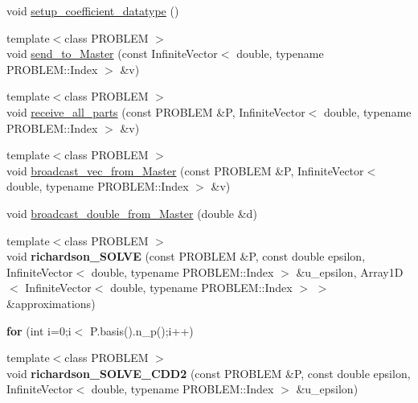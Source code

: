 \begin{CompactItemize}
\item 
void \hyperlink{namespaceFrameTL_010a7b97f26561b6923f285c1cbb8d02}{setup\_\-coefficient\_\-datatype} ()
\item 
{\footnotesize template$<$class PROBLEM $>$ }\\void \hyperlink{namespaceFrameTL_868f995657a7f68345fe24340658282e}{send\_\-to\_\-Master} (const InfiniteVector$<$ double, typename PROBLEM::Index $>$ \&v)
\item 
{\footnotesize template$<$class PROBLEM $>$ }\\void \hyperlink{namespaceFrameTL_3ea47092508598512ecc54955117a16f}{receive\_\-all\_\-parts} (const PROBLEM \&P, InfiniteVector$<$ double, typename PROBLEM::Index $>$ \&v)
\item 
{\footnotesize template$<$class PROBLEM $>$ }\\void \hyperlink{namespaceFrameTL_99afa22a98a5b20d8326b2983bb19088}{broadcast\_\-vec\_\-from\_\-Master} (const PROBLEM \&P, InfiniteVector$<$ double, typename PROBLEM::Index $>$ \&v)
\item 
void \hyperlink{namespaceFrameTL_5b01ba18f76ca06fb77d8cbca90492e8}{broadcast\_\-double\_\-from\_\-Master} (double \&d)
\item 
\hypertarget{namespaceFrameTL_bacf8c8fd02179e596a29355d939ec7c}{
{\footnotesize template$<$class PROBLEM $>$ }\\void \textbf{richardson\_\-SOLVE} (const PROBLEM \&P, const double epsilon, InfiniteVector$<$ double, typename PROBLEM::Index $>$ \&u\_\-epsilon, Array1D$<$ InfiniteVector$<$ double, typename PROBLEM::Index $>$ $>$ \&approximations)}
\label{namespaceFrameTL_bacf8c8fd02179e596a29355d939ec7c}

\item 
\hypertarget{namespaceFrameTL_1111c8e69e372f889361af29dad3c8dd}{
\textbf{for} (int i=0;i$<$ P.basis().n\_\-p();i++)}
\label{namespaceFrameTL_1111c8e69e372f889361af29dad3c8dd}

\item 
\hypertarget{namespaceFrameTL_1a05babec2a9b0c713764d9ba15e2048}{
{\footnotesize template$<$class PROBLEM $>$ }\\void \textbf{richardson\_\-SOLVE\_\-CDD2} (const PROBLEM \&P, const double epsilon, InfiniteVector$<$ double, typename PROBLEM::Index $>$ \&u\_\-epsilon)}
\label{namespaceFrameTL_1a05babec2a9b0c713764d9ba15e2048}


\end{CompactItemize}
